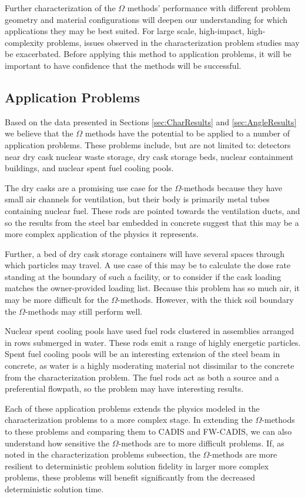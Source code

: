 Further characterization of the $\Omega$ methods' performance with different
problem geometry and material configurations will deepen our understanding for
which applications they may be best suited. For large scale, high-impact,
high-complexity problems, issues observed in the characterization problem
studies may be exacerbated. Before applying this method to application problems,
it will be important to have confidence that the methods will be successful.

\subsection{Application Problems}
\label{subsec:appprobs}

Based on the data presented in Sections \ref{sec:CharResults} and
\ref{sec:AngleResults} we believe that the
$\Omega$ methods have the potential to be applied to a number of application problems.
These
problems include, but are not limited to: detectors near dry cask nuclear waste
storage, dry cask storage beds, nuclear containment buildings, and nuclear spent fuel
cooling pools.

The dry casks are a promising use case for the $\Omega$-methods because
they have small air
channels for ventilation, but their body is primarily metal tubes containing
nuclear fuel. These rods are pointed towards the ventilation ducts, and so the
results from the steel bar embedded in concrete suggest that this may be a more
complex application of the physics it represents.

Further, a bed of dry cask storage containers will have several spaces through
which particles may travel. A use case of this may be to calculate the dose rate
standing at the boundary of such a facility, or to consider if the cask loading
matches the owner-provided loading list. Because this problem has so much
air, it may be more difficult for the $\Omega$-methods. However, with the thick
soil boundary the $\Omega$-methods may still perform well.

Nuclear spent cooling pools have used fuel rods clustered in assemblies arranged
in rows submerged in water. These rods emit a range of
highly energetic particles. Spent fuel cooling
pools will be an interesting extension of the steel beam in concrete, as water
is a highly moderating material not dissimilar to the concrete from the
characterization problem. The fuel rods act as both a source and a preferential
flowpath, so the problem may have interesting results.

Each of these application problems extends the physics modeled in the
characterization problems to a more complex stage. In extending the
$\Omega$-methods to these problems and comparing them to CADIS and FW-CADIS, we
can also understand how sensitive the $\Omega$-methods are to more difficult
problems. If, as noted in the characterization problems subsection, the
$\Omega$-methods are more resilient to deterministic problem solution fidelity
in larger more complex problems,
these problems will benefit significantly from the decreased deterministic
solution time.
